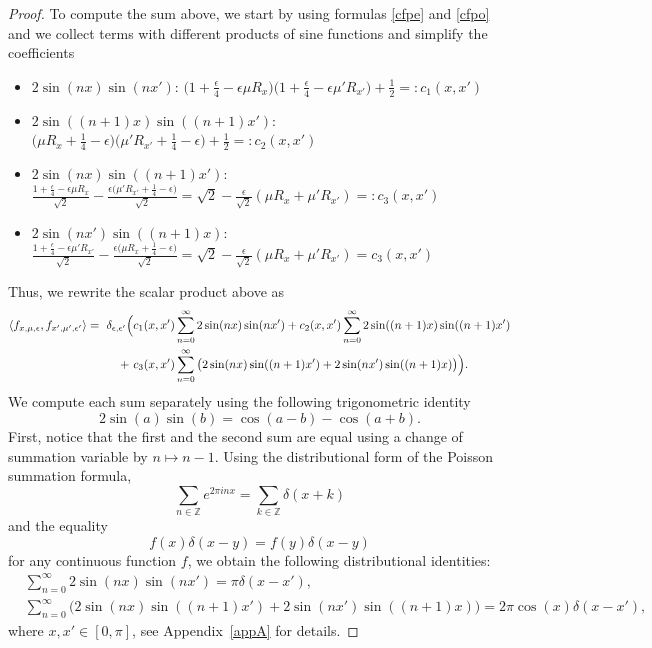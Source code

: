 \documentclass[11pt]{amsart}
\newcommand{\Z}{\mathbb{Z}}
\theoremstyle{definition}
\theoremstyle{remark}
\theoremstyle{plain}
\numberwithin{equation}{section}
\numberwithin{lemma}{section}
\numberwithin{definition}{section}
\numberwithin{proposition}{section}
\numberwithin{corollary}{section}
\numberwithin{theorem}{section}
\numberwithin{remark}{section}
\begin{document}
\begin{proof}
To compute the sum above, we start by using formulas \eqref{cfpe} and \eqref{cfpo} and we collect terms with different products of sine functions and simplify the coefficients 
\begin{itemize}
 \item $2\sin(nx)\sin(nx')$: $\big(1+\frac{\epsilon}{4}-\epsilon\mu R_x\big) \big(1+\frac{\epsilon}{4}-\epsilon\mu' R_{x'}\big)+ \frac{1}{2}=:c_1(x,x')$
 \item $2\sin((n+1)x)\sin((n+1)x')$: $\big(\mu R_x+\frac{1}{4}-\epsilon\big)\big(\mu' R_{x'}+\frac{1}{4}-\epsilon\big)+ \frac{1}{2}=:c_2(x,x')$
 \item $2\sin(nx)\sin((n+1)x')$: $\frac{1+\frac{\epsilon}{4}-\epsilon\mu R_x}{\sqrt{2}} - \frac{\epsilon\big(\mu' R_{x'}+\frac{1}{4}-\epsilon\big)}{\sqrt{2}}=\sqrt{2}-\frac{\epsilon}{\sqrt{2}}(\mu R_x+\mu' R_{x'})=:c_3(x,x')$ \\
 \item $2\sin(nx')\sin((n+1)x)$: $\frac{1+\frac{\epsilon}{4}-\epsilon\mu' R_{x'}}{\sqrt{2}} - \frac{\epsilon\big(\mu R_{x}+\frac{1}{4}-\epsilon\big)}{\sqrt{2}}=\sqrt{2}-\frac{\epsilon}{\sqrt{2}}(\mu R_x+\mu' R_{x'})=c_3(x,x')$ 
\end{itemize}
Thus, we rewrite the scalar product above as 
\begin{align}
  \langle f_{x,\mu,\epsilon}, f_{x',\mu',\epsilon'} \rangle 
 = \  \delta_{\epsilon,\epsilon'} \Big( & c_1(x,x')\sum_{n=0}^\infty 2\sin(nx)\sin(nx') + c_2(x,x')\sum_{n=0}^\infty 2\sin((n+1)x)\sin((n+1)x') \notag \\
  + \ & c_3(x,x')\sum_{n=0}^\infty \big(2\sin(nx)\sin((n+1)x') + 2\sin(nx')\sin((n+1)x) \big) \Big).\label{sp_continuous}
 \end{align}
 We compute each sum separately using the following trigonometric identity
\begin{equation} \label{2sin_id}
  2\sin(a)\sin(b)=\cos(a-b)-\cos(a+b).
\end{equation}
 First, notice that the first and the second sum are equal using a change of summation variable by $n \mapsto n-1$.
Using the distributional form of the Poisson summation formula,
\begin{equation}\label{poisson_summation}
 \sum_{n\in\Z}e^{2\pi inx}=\sum_{k\in\Z}\delta(x+k)
\end{equation}
and the equality
\begin{equation} \label{Diracdelta}
 f(x)\delta(x-y)=f(y)\delta(x-y)
\end{equation}
for any continuous function $f$,
we obtain the following distributional identities:
\begin{align} 
& \sum_{n=0}^\infty 2\sin(nx)\sin(nx') =\pi \delta(x-x') \label{2sin}, \\ 
& \sum_{n=0}^\infty \Big( 2\sin(nx) \sin((n+1)x') + 2\sin(nx')\sin((n+1)x) \Big) =2\pi \cos(x) \delta(x-x'), \label{lastsum_final}
\end{align}
where $x,x'\in[0,\pi]$, see Appendix~\ref{appA} for details.


\end{proof}
\end{document}
